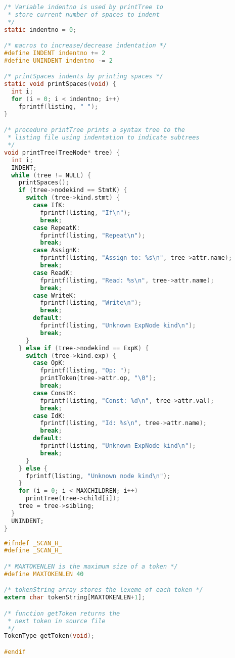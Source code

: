 \documentclass[lang=cn,10pt]{elegantbook}
\begin{document}
\begin{lstlisting}[caption={util.c},language=c]
/* Variable indentno is used by printTree to
 * store current number of spaces to indent
 */
static indentno = 0;

/* macros to increase/decrease indentation */
#define INDENT indentno += 2
#define UNINDENT indentno -= 2

/* printSpaces indents by printing spaces */
static void printSpaces(void) {
  int i;
  for (i = 0; i < indentno; i++)
    fprintf(listing, " ");
}

/* procedure printTree prints a syntax tree to the 
 * listing file using indentation to indicate subtrees
 */
void printTree(TreeNode* tree) {
  int i;
  INDENT;
  while (tree != NULL) {
    printSpaces();
    if (tree->nodekind == StmtK) {
      switch (tree->kind.stmt) {
        case IfK:
          fprintf(listing, "If\n");
          break;
        case RepeatK:
          fprintf(listing, "Repeat\n");
          break;
        case AssignK:
          fprintf(listing, "Assign to: %s\n", tree->attr.name);
          break;
        case ReadK:
          fprintf(listing, "Read: %s\n", tree->attr.name);
          break;
        case WriteK:
          fprintf(listing, "Write\n");
          break;
        default:
          fprintf(listing, "Unknown ExpNode kind\n");
          break;
      }
    } else if (tree->nodekind == ExpK) {
      switch (tree->kind.exp) {
        case OpK:
          fprintf(listing, "Op: ");
          printToken(tree->attr.op, "\0");
          break;
        case ConstK:
          fprintf(listing, "Const: %d\n", tree->attr.val);
          break;
        case IdK:
          fprintf(listing, "Id: %s\n", tree->attr.name);
          break;
        default:
          fprintf(listing, "Unknown ExpNode kind\n");
          break;
      }
    } else {
      fprintf(listing, "Unknown node kind\n");
    }
    for (i = 0; i < MAXCHILDREN; i++)
      printTree(tree->child[i]);
    tree = tree->sibling;
  }
  UNINDENT;
}
\end{lstlisting}

\begin{lstlisting}[caption={scan.h},language=c]
#ifndef _SCAN_H_
#define _SCAN_H_

/* MAXTOKENLEN is the maximum size of a token */
#define MAXTOKENLEN 40

/* tokenString array stores the lexeme of each token */
extern char tokenString[MAXTOKENLEN+1];

/* function getToken returns the 
 * next token in source file
 */
TokenType getToken(void);

#endif
\end{lstlisting}
\end{document}

